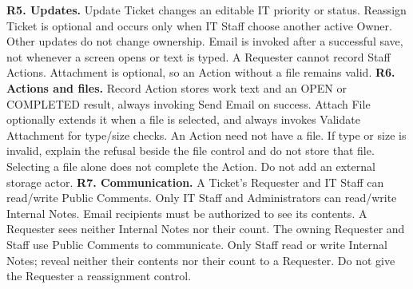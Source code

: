 \begin{contenttable}
{\textbf{R5. Updates.} Update Ticket changes an editable IT priority or status. Reassign Ticket is optional and occurs only when IT Staff choose another active Owner. Other updates do not change ownership. Email is invoked after a successful save, not whenever a screen opens or text is typed. A Requester cannot record Staff Actions. Attachment is optional, so an Action without a file remains valid.}
{\textbf{R6. Actions and files.} Record Action stores work text and an OPEN or COMPLETED result, always invoking Send Email on success. Attach File optionally extends it when a file is selected, and always invokes Validate Attachment for type/size checks. An Action need not have a file. If type or size is invalid, explain the refusal beside the file control and do not store that file. Selecting a file alone does not complete the Action. Do not add an external storage actor.}
{\textbf{R7. Communication.} A Ticket's Requester and IT Staff can read/write Public Comments. Only IT Staff and Administrators can read/write Internal Notes. Email recipients must be authorized to see its contents. A Requester sees neither Internal Notes nor their count. The owning Requester and Staff use Public Comments to communicate. Only Staff read or write Internal Notes; reveal neither their contents nor their count to a Requester. Do not give the Requester a reassignment control.}

\end{contenttable}
